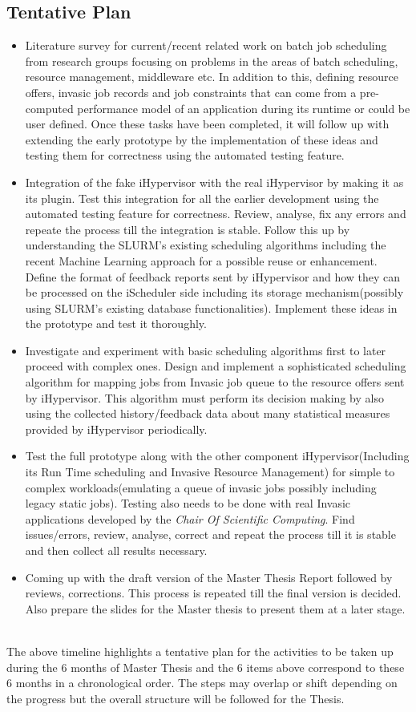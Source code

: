 \documentclass{article}
\begin{document}
\subsection{Tentative Plan}
\begin{itemize}
\item Literature survey for current/recent related work on batch job scheduling from research groups focusing on problems in the areas of batch scheduling, resource management, middleware etc. In addition to this, defining resource offers, invasic job records and job constraints that can come from a pre-computed performance model of an application during its runtime or could be user defined. Once these tasks have been completed, it will follow up with extending the early prototype by the implementation of these ideas and testing them for correctness using the automated testing feature.
\item Integration of the fake iHypervisor with the real iHypervisor by making it as its plugin. Test this integration for all the earlier development using the automated testing feature for correctness. Review, analyse, fix any errors and repeate the process till the integration is stable. Follow this up by understanding the SLURM's existing scheduling algorithms including the recent Machine Learning approach for a possible reuse or enhancement. Define the format of feedback reports sent by iHypervisor and how they can be processed on the iScheduler side including its storage mechanism(possibly using SLURM's existing database functionalities). Implement these ideas in the prototype and test it thoroughly.
\item Investigate and experiment with basic scheduling algorithms first to later proceed with complex ones. Design and implement a sophisticated scheduling algorithm for mapping jobs from Invasic job queue to the resource offers sent by iHypervisor. This algorithm must perform its decision making by also using the collected history/feedback data about many statistical measures provided by iHypervisor periodically. 
\item Test the full prototype along with the other component iHypervisor(Including its Run Time scheduling and Invasive Resource Management) for simple to complex workloads(emulating a queue of invasic jobs possibly including legacy static jobs). Testing also needs to be done with real Invasic applications developed by the \textit{Chair Of Scientific Computing}. Find issues/errors, review, analyse, correct and repeat the process till it is stable and then collect all results necessary.
\item Coming up with the draft version of the Master Thesis Report followed by reviews, corrections. This process is repeated till the final version is decided. Also prepare the slides for the Master thesis to present them at a later stage.
\end{itemize}
\noindent
\\The above timeline highlights a tentative plan for the activities to be taken up during the 6 months of Master Thesis and the 6 items above correspond to these 6 months in a chronological order. The steps may overlap or shift depending on the progress but the overall structure will be followed for the Thesis.
\end{document}
